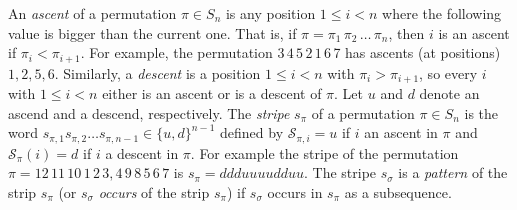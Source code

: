 \documentclass[a4paper]{llncs}
\newcommand{\Perm}[1]{\mathcal{S}_{#1}}
\newcommand{\ptext}{\pi}
\newcommand{\pmotif}{\sigma}
\newcommand{\dstep}{d}
\newcommand{\ustep}{u}
\begin{document}
An \emph{ascent} of a permutation $\pi \in S_n$ is any position 
$1 \leq i < n$ where the following value is bigger than the current one. 
That is, if $\pi = \pi_1\,\pi_2\,\ldots\,\pi_n$, then
$i$ is an ascent if $\pi_i < \pi_{i+1}$.
For example, the permutation 
$3\,4\,5\,2\,1\,6\,$7 has ascents (at positions) $1,2,5,6$.
Similarly, a \emph{descent} is a position 
$1 \leq i < n$ with $\pi_i > \pi_{i+1}$, 
so every $i$ with $1 \leq i < n$ either is an ascent or is a descent of 
$\pi$.
Let $\ustep$ and $\dstep$ denote an ascend and a descend, respectively.
The \emph{stripe} $s_\pi$ of a permutation $\pi \in S_n$ is the word
$s_{\pi,1} s_{\pi,2} \ldots s_{\pi,n-1} \in \{\ustep,\dstep\}^{n-1}$ 
defined by 
$\mathcal{S}_{\pi,i} = \ustep$ if $i$ an ascent in $\pi$ and
$\mathcal{S}_\pi(i) = \dstep$ if $i$ a descent in $\pi$.
For example the stripe of the permutation 
$\pi = 12\,11\,10\,1\,2\,3,4\,9\,8\,5\,6\,7$ 
is 
$s_\pi = \dstep\dstep\dstep\ustep\ustep\ustep\ustep\dstep\dstep\ustep\ustep$.
The stripe $s_\sigma$ is a \emph{pattern} of the strip $s_\pi$
(or $s_\sigma$ \emph{occurs} of the strip $s_\pi$) if $s_\sigma$ occurs in
$s_\pi$ as a subsequence.


		
\end{document}

